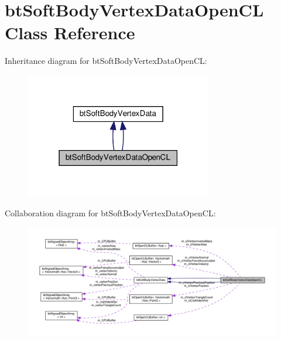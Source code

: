 \hypertarget{classbtSoftBodyVertexDataOpenCL}{}\section{bt\+Soft\+Body\+Vertex\+Data\+Open\+CL Class Reference}
\label{classbtSoftBodyVertexDataOpenCL}


Inheritance diagram for bt\+Soft\+Body\+Vertex\+Data\+Open\+CL\+:
\nopagebreak
\begin{figure}[H]
\begin{center}
\leavevmode
\includegraphics[width=231pt]{classbtSoftBodyVertexDataOpenCL__inherit__graph}
\end{center}
\end{figure}


Collaboration diagram for bt\+Soft\+Body\+Vertex\+Data\+Open\+CL\+:
\nopagebreak
\begin{figure}[H]
\begin{center}
\leavevmode
\includegraphics[width=350pt]{classbtSoftBodyVertexDataOpenCL__coll__graph}
\end{center}
\end{figure}

